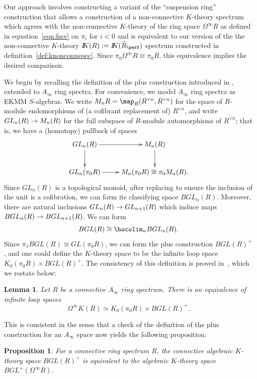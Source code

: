 \documentclass{amsart}
\newcommand{\htp}{\simeq}
\renewcommand{\to}{\mathchoice{\longrightarrow}{\rightarrow}{\rightarrow}{\rightarrow}}
\newcommand{\bbK}{I\mspace{-6.mu}K}
\renewcommand{\i}{\infty}
\numberwithin{equation}{section}
\newtheorem{lemma}[equation]{Lemma}
\newtheorem{proposition}[equation]{Proposition}
\theoremstyle{definition}
\begin{document}
Our approach involves constructing a variant of the ``suspension
ring'' construction that allows a construction of a non-connective
$K$-theory spectrum which agrees with the non-connective $K$-theory of
the ring space $\Omega^\infty R$ as defined in equation~\ref{eqn:fssv}
on $\pi_i$ for $i < 0$ and is equivalent to our version of the the
non-connective $K$-theory $\bbK(R):=\bbK(\widehat{R}_{\perf})$
spectrum constructed in definition~\ref{def:knonconnspec}.  Since
$\pi_0\Omega^\infty R\cong\pi_0 R$, this equivalence
implies the desired comparison.

We begin by recalling the definition of the plus construction
introduced in \cite{WaldA2}, extended to $A_\i$ ring spectra.  For
convenience, we model $A_\i$ ring spectra as EKMM $S$-algebras.  We
write $M_n R=\map_R(R^{\lor n},R^{\lor n})$ for the space of
$R$-module endomorphisms of (a cofibrant replacement of) $R^{\lor n}$,
and write $GL_n(R)\to M_n(R)$ for the full subspace of $R$-module
automorphisms of $R^{\lor n}$; that is, we have a (homotopy) pullback
of spaces
\[
\xymatrix{
GL_n(R) \ar[r] \ar[d] & M_n (R) \ar[d] \\
GL_n (\pi_0 R) \ar[r] & M_n (\pi_0 R) \cong \pi_0 M_n (R). \\
}
\]
Since $GL_n (R)$ is a topological monoid, after replacing to ensure
the inclusion of the unit is a cofibration, we can form its classifying 
space $BGL_n (R)$.  Moreover, there are natural inclusions
$GL_n(R) \to GL_{n+1}(R)$ which induce maps $BGL_n(R) \to
BGL_{n+1}(R)$.  We can form
\[
BGL(R) \cong \hocolim_n BGL_n(R).
\]
Since $\pi_1 BGL(R) \cong GL (\pi_0 R)$, we can form the plus
construction $BGL(R)^+$, and one could define the $K$-theory space to
be the infinite loop space $K_0(\pi_0 R) \times BGL(R)^+$.  The
consistency of this definition is proved in~\cite[7.1]{EKMM}, which we
restate below:

\begin{lemma}\label{lem:plusconst}
Let $R$ be a connective $A_\infty$ ring spectrum.  There is an
equivalence of infinite loop spaces
\[
\Omega^\infty K(R) \htp K_0(\pi_0 R) \times BGL(R)^+.
\]
\end{lemma}

This is consistent in the sense that a check of the definition of the
plus construction for an $A_\infty$ space \cite[\S 7]{MayK} now yields
the following proposition:

\begin{proposition}\label{prop:kcomp}
For a connective ring spectrum $R$, the connective algebraic
$K$-theory space $BGL(R)^+$ is equivalent to the algebraic
$K$-theory space $BGL^+(\Omega^\infty R)$.
\end{proposition}
\end{document}

